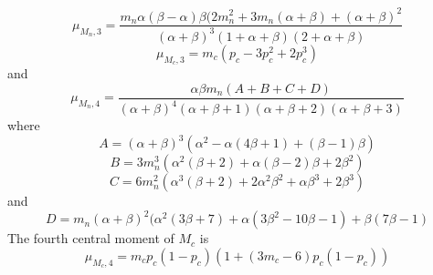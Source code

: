 \documentclass{article}
\begin{document}
\begin{appendices}
\begin{equation}
    \mu_{M_n,3}=\frac{m_n\alpha(\beta-\alpha)\beta(2m_n^2+3m_n(\alpha+\beta)+(\alpha+\beta)^2}{(\alpha+\beta)^3(1+\alpha+\beta)(2+\alpha+\beta)}
\end{equation}
\begin{equation}
    \mu_{M_c,3}=m_c(p_c-3p_c^2+2p_c^3)
\end{equation}
and
\begin{equation}
    \mu_{M_n,4}=\frac{\alpha\beta m_n(A+B+C+D)}{(\alpha +\beta )^4 (\alpha +\beta +1) (\alpha +\beta +2) (\alpha +\beta +3)}
\end{equation}
where
\begin{equation*}
    A = (\alpha +\beta )^3 \left(\alpha ^2-\alpha  (4 \beta +1)+(\beta -1) \beta \right)
\end{equation*}
\begin{equation*}
    B = 3m_n^3\left(\alpha ^2 (\beta +2)+\alpha  (\beta -2) \beta +2 \beta ^2\right)
\end{equation*}
\begin{equation*}
    C = 6m_n^2\left(\alpha ^3 (\beta +2)+2 \alpha ^2 \beta ^2+\alpha  \beta ^3+2 \beta ^3\right)
\end{equation*}
and
\begin{equation*}
    D = m_n(\alpha +\beta )^2(\alpha ^2 (3 \beta +7)+\alpha  (3 \beta ^2-10 \beta -1)+\beta  (7 \beta -1)
\end{equation*}
The fourth central moment of $M_c$ is
\begin{equation}
    \mu_{M_c,4}=m_cp_c(1-p_c)(1+(3m_c-6)p_c(1-p_c))
\end{equation}


\end{appendices}
\end{document}
